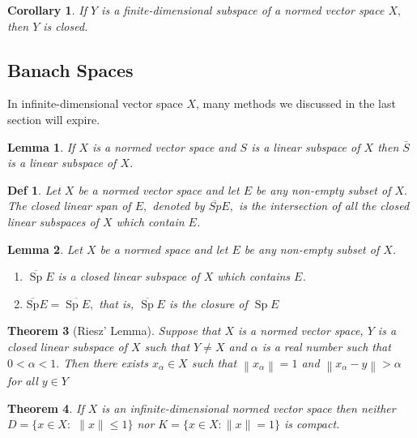 \documentclass[10pt]{paper}
\newtheorem{theorem}{Theorem}[section]
\newtheorem{definition}{Def}[section]
\newtheorem{corollary}{Corollary}[section]
\newtheorem{lemma}[theorem]{Lemma}
\begin{document}
\begin{corollary}
    If $Y$ is a finite-dimensional subspace of a normed vector space $X,$ then $Y$ is closed.
\end{corollary}

\subsection{Banach Spaces}

\par In infinite-dimensional vector space $X$, many methods we discussed in the last section will expire.

\begin{lemma}
    If $X$ is a normed vector space and $S$ is a linear subspace of $X$ then $\bar{S}$ is a linear subspace of $X$.
\end{lemma}


\begin{definition}
    Let $X$ be a normed vector space and let $E$ be any non-empty subset of $X .$ The closed linear span of $E,$ denoted by $\overline{Sp} E,$ is the intersection of all the closed linear subspaces of $X$ which contain $E$.
\end{definition}

\begin{lemma}
    Let $X$ be a normed space and let $E$ be any non-empty subset of $X$.
    \begin{enumerate}
        \item $\overline{\operatorname{Sp}} E$ is a closed linear subspace of $X$ which contains $E$.
        \item $\overline{\mathrm{Sp}} E=\overline{\operatorname{Sp} E},$ that is, $\overline{\operatorname{Sp}} E$ is the closure of $\operatorname{Sp} E$
    \end{enumerate}
\end{lemma}

\begin{theorem}[Riesz’ Lemma]
    Suppose that $X$ is a normed vector space, $Y$ is a closed linear subspace of $X$ such that $Y \neq X$ and $\alpha$ is a real number such that $0<\alpha<1 .$ Then there exists $x_{\alpha} \in X$ such that $\left\|x_{\alpha}\right\|=1$ and $\left\|x_{\alpha}-y\right\|>\alpha$ for all $y \in Y$
\end{theorem}

\begin{theorem}
    If $X$ is an infinite-dimensional normed vector space then neither $D=\{x \in X:$ $\|x\| \leq 1\}$ nor $K=\{x \in X:\|x\|=1\}$ is compact.
\end{theorem}
\end{document}
